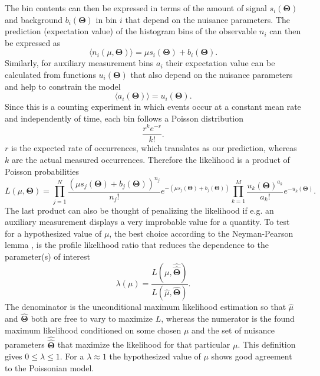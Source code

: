 The bin contents can then be expressed in terms of the amount of signal $s_i(\bm{\Theta})$ and background $b_i(\bm{\Theta})$ in bin $i$ that depend on the nuisance parameters. The prediction (expectation value) of the histogram bins of the observable $n_i$ can then be expressed as 
\begin{equation} \label{eq:n_i}
    \langle n_i(\mu,\bm{\Theta})\rangle = \mu s_i(\bm{\Theta}) +b_i(\bm{\Theta}). 
\end{equation}
Similarly, for auxiliary measurement bins $a_i$ their expectation value can be calculated from functions $u_i(\bm{\Theta})$ that also depend on the nuisance parameters and help to constrain the model
\begin{equation} \label{eq:a_i}
    \langle a_i(\bm{\Theta}) \rangle = u_i(\bm{\Theta}).
\end{equation}
Since this is a counting experiment in which events occur at a constant mean rate and independently of time, each bin follows a Poisson distribution
\begin{equation}\label{eq:poisson}
    \frac{r^k e^{-r}}{k!}.
\end{equation}
$r$ is the expected rate of occurrences, which translates as our prediction, whereas $k$ are the actual measured occurrences. Therefore the likelihood is a product of Poisson probabilities
\begin{equation}\label{eq:likelihood}
    L(\mu,\bm{\Theta})=
    \prod_{j=1}^N \frac{(\mu s_j(\bm{\Theta}) + b_j(\bm{\Theta}))^{n_j}}{n_j !} e^{-(\mu s_j(\bm{\Theta}) + b_j(\bm{\Theta}))}
    \prod_{k=1}^M \frac{u_k(\bm{\Theta})^{a_k}}{a_k!} e^{-u_k(\bm{\Theta})}.
\end{equation}
The last product can also be thought of penalizing the likelihood if e.g. an auxiliary measurement displays a very improbable value for a quantity. To test for a hypothesized value of $\mu$, the best choice according to the Neyman-Pearson lemma \citep{behnke2013data}, is the profile likelihood ratio that reduces the dependence to the parameter(s) of interest
\begin{equation}\label{eq:likelihood_ratio}
\lambda(\mu)=
    \frac{L(\mu,\hat{\hat{\bm{\Theta}}})}
    {L(\hat{\mu},\hat{\bm{\Theta}})}.
\end{equation}
The denominator is the unconditional maximum likelihood estimation so that $\hat{\mu}$ and $\hat{\bm{\Theta}}$ both are free to vary to maximize $L$, whereas the numerator is the found maximum likelihood conditioned on some chosen $\mu$ and the set of nuisance parameters $\hat{\hat{\bm{\Theta}}}$ that maximize the likelihood for that particular $\mu$. This definition gives $0 \leq \lambda \leq 1$. For a $\lambda \approx 1$ the hypothesized value of $\mu$ shows good agreement to the Poissonian model.

